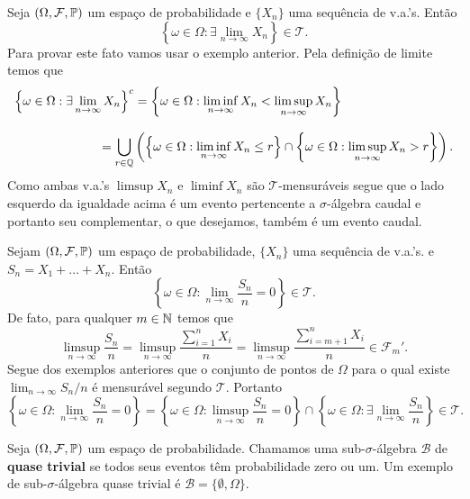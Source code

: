 \begin{exemplo}
	Seja $(\Omega,\mathcal{F},\mathbb{P})$ um espaço de probabilidade e
	$\{X_n\}$ uma sequência de v.a.'s. Então 
		\[
			\left\{
				\omega\in \Omega: 
				\exists \lim_{n\to\infty} X_n
			\right\}
			\in
			\mathcal{T}.
		\]
	Para provar este fato vamos usar o exemplo anterior.
	Pela definição de limite temos que 
	\begin{align*}
		\left\{
			\omega\in \Omega: 
			\exists \lim_{n\to\infty} X_n
		\right\}^c
		&=
		\left\{
			\omega\in \Omega: 
			\liminf_{n\to\infty} X_n 
			< 
			\limsup_{n\to\infty} X_n
		\right\}
		\\[0.3cm]
		&\hspace*{-1cm}=
		\bigcup_{r\in \Q}
		\left(		
		\left\{
			\omega\in \Omega: 
			\liminf_{n\to\infty} X_n 
			\leq r 
		\right\}
		\cap
		\left\{
			\omega\in \Omega: 
			\limsup_{n\to\infty} X_n 
			> r 
		\right\}
		\right).
	\end{align*}
Como ambas v.a.'s $\limsup X_n$ e $\liminf X_n$ são $\mathcal{T}$-mensuráveis
segue que o lado esquerdo da igualdade acima é um evento pertencente 
a $\sigma$-álgebra caudal e portanto seu complementar, o que desejamos,
também é um evento caudal.
\end{exemplo}





\begin{exemplo}
	Sejam $(\Omega,\mathcal{F},\mathbb{P})$ um espaço de probabilidade,
	$\{X_n\}$ uma sequência de v.a.'s. e $S_n=X_1+\ldots+X_n$.
	Então 
	\[
		\left\{
			\omega\in \Omega: 
			\lim_{n\to\infty} \frac{S_n}{n}=0
		\right\}
		\in
		\mathcal{T}.
	\]
	De fato, para qualquer $m\in\mathbb{N}$ temos que
		\[
			\limsup_{n\to\infty} \frac{S_n}{n}
			=
			\limsup_{n\to\infty} \frac{\sum_{i=1}^n X_i}{n}
			=
			\limsup_{n\to\infty} \frac{\sum_{i=m+1}^n X_i}{n}
			\in
			\mathcal{F}_{m}'.
		\]
	Segue dos exemplos anteriores que o conjunto de pontos 
	de $\Omega$ para o qual existe $\lim_{n\to\infty} S_n/n$ 
	é mensurável segundo $\mathcal{T}$. Portanto
	\[
		\left\{
			\omega\in \Omega: 
			\lim_{n\to\infty} \frac{S_n}{n}=0
		\right\}
		=
		\left\{
			\omega\in \Omega: 
			\limsup_{n\to\infty} \frac{S_n}{n}=0
		\right\}
		\cap
		\left\{
			\omega\in \Omega: 
			\exists \lim_{n\to\infty} \frac{S_n}{n}
		\right\}
		\in
		\mathcal{T}.
	\]
\end{exemplo}





Seja $(\Omega,\mathcal{F},\mathbb{P})$ um espaço de probabilidade.
Chamamos uma sub-$\sigma$-álgebra $\mathcal{B}$ de
{\bf quase trivial} se todos seus eventos têm probabilidade
zero ou um. Um exemplo de sub-$\sigma$-álgebra 
quase trivial é $\mathcal{B}=\{\emptyset,\Omega\}$.





